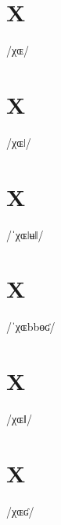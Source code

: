 \documentclass[10pt,a4paper,twoside]{book}
\begin{document}
\section*{X}

\begin{multicols}{3}
 {/χɶ/} {}
\end{multicols}

\section*{X}

\begin{multicols}{3}
 {/χɶǀ/} {}
\end{multicols}

\section*{X}

\begin{multicols}{3}
 {/ˈχɶǀʉǁ/} {}
\end{multicols}

\section*{X}

\begin{multicols}{3}
 {/ˈχɶbbɵʛ/} {}
\end{multicols}

\section*{X}

\begin{multicols}{3}
 {/χɶǁ/} {}
\end{multicols}

\section*{X}

\begin{multicols}{3}
 {/χɶʛ/} {}
\end{multicols}
\end{document}
